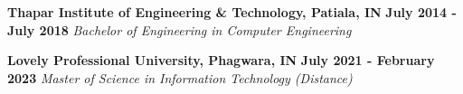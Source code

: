 

\begin{cventries}
  \cvedentry
    {\bf Thapar Institute of Engineering \& Technology, Patiala, IN }
    {\bf July 2014 - July 2018}
    {\textit {Bachelor of Engineering in Computer Engineering}} %

    \vspace{-1mm}

    \cvedentry
    {\bf Lovely Professional University, Phagwara, IN}
    {\bf July 2021 - February 2023}
    {\textit {Master of Science in Information Technology (Distance)}} %
\end{cventries}

